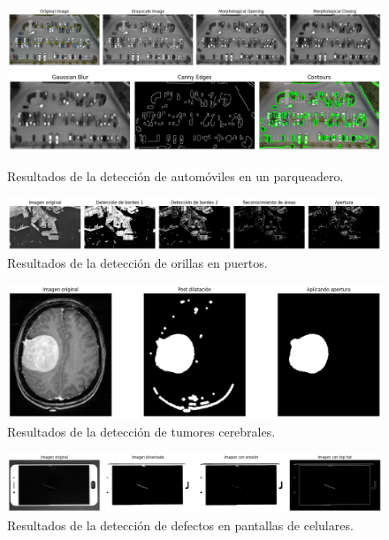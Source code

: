 \begin{figure}[t]
    \centering
    \includegraphics[height=0.15\textwidth]{./figures/drive/parqueadero.png}
    \includegraphics[height=0.15\textwidth]{./figures/drive/parqueadero_2.png}
    \caption{Resultados de la detección de automóviles en un parqueadero.}
    \label{fig:parqueadero_results}
\end{figure}

\begin{figure}[t]
    \centering
    \includegraphics[width=1\textwidth]{./figures/drive/puerto.png}
    \caption{Resultados de la detección de orillas en puertos.}
    \label{fig:puerto_results}
\end{figure}

\begin{figure}[t]
    \centering
    \includegraphics[height=0.30\textwidth]{./figures/drive/tumor.png}
    \caption{Resultados de la detección de tumores cerebrales.}
    \label{fig:tumor_results}
\end{figure}

\begin{figure}[t]
    \centering
    \includegraphics[width=1\textwidth]{./figures/drive/celulares.png}
    \caption{Resultados de la detección de defectos en pantallas de celulares.}
    \label{fig:celular_results}
\end{figure}

